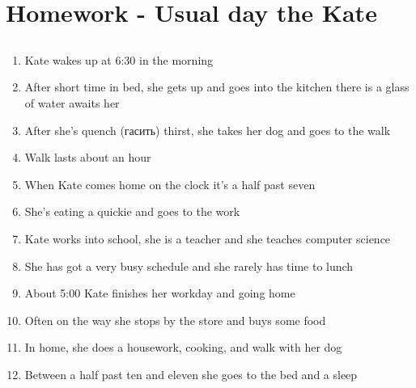 \section{Homework - Usual day the Kate}

\subsection{}
 
\begin{enumerate} 
	\item Kate wakes up at 6:30 in the morning
	\item After short time in bed, she gets up and goes into the kitchen there is a glass of water awaits her
	\item After she's quench (гасить) thirst, she takes her dog and goes to the walk
	\item Walk lasts about an hour
	\item When Kate comes home on the clock it's a half past seven
	\item She's eating a quickie and goes to the work
	\item Kate works into school, she is a teacher and she teaches computer science
	\item She has got a very busy schedule and she rarely has time to lunch
	\item About 5:00 Kate finishes her workday and going home  
	\item Often on the way she stops by the store and buys some food
	\item In home, she does a housework, cooking, and walk with her dog
	\item Between a half past ten and eleven she goes to the bed and a sleep 
	
\end{enumerate}


 